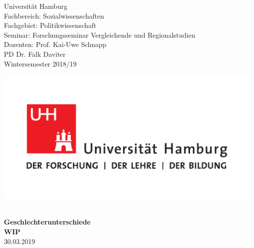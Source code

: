 \documentclass[12pt, 
    twoside=false, 
    bibliography=totoc, 
    numbers=endperiod, 
    headings=normal, 
    toc=chapterentrydotfill
    ]{scrbook}
\begin{document}
\begin{titlepage}
    \begin{minipage}[t]{0.6\textwidth}
    \flushleft 
    Universität Hamburg \\
    Fachbereich: Sozialwissenschaften \\
    Fachgebiet: Politikwissenschaft \\
    Seminar: Forschungsseminar Vergleichende und Regionalstudien \\ 
    Dozenten: Prof. Kai-Uwe Schnapp \\
    PD Dr. Falk Daviter \\
    Wintersemester 2018/19 \\
    \end{minipage}
    \hfill
    \begin{minipage}[t][1.7cm][b]{0.35\textwidth}
    \includegraphics[width=\textwidth]{images/UHH-Logo_2010_Farbe_CMYK.pdf}
    \end{minipage}
    
    \vspace*{\fill}
    \begin{center}
	\vspace{1cm} \vspace{0.2cm} \\
	\textbf{\Large Geschlechterunterschiede} \\
	\textbf{WIP} \\
	\vspace{0.2cm}
	30.03.2019
	\end{center}
    \vspace*{\fill}
	

\end{titlepage}
\end{document}
